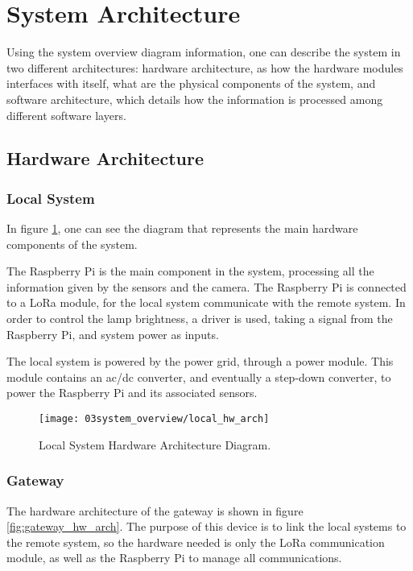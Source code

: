 
\section{System Architecture}
Using the system overview diagram information, one can describe the system in two different architectures: hardware architecture, as how the hardware modules interfaces with itself, what are the physical components of the system, and software architecture, which details how the information is processed among different software layers.

\clearpage
\subsection{Hardware Architecture}

\subsubsection{Local System}

In figure \ref{fig:local_hw_arch}, one can see the diagram that represents the main hardware components of the system.

The Raspberry Pi is the main component in the system, processing all the information given by the sensors and the camera. The Raspberry Pi is connected to a LoRa module, for the local system communicate with the remote system. In order to control the lamp brightness, a driver is used, taking a signal from the Raspberry Pi, and system power as inputs.

The local system is powered by the power grid, through a power module. This module contains an \ac{ac}/\ac{dc} converter, and eventually a step-down converter, to power the Raspberry Pi and its associated sensors.

\begin{figure}[ht]
	\centering
	\texttt{[image: 03system\_overview/local\_hw\_arch]}
	\caption{Local System Hardware Architecture Diagram.}
	\label{fig:local_hw_arch}
\end{figure}

\clearpage
\subsubsection{Gateway}

The hardware architecture of the gateway is shown in figure \ref{fig:gateway_hw_arch}. The purpose of this device is to  link the local systems to the remote system, so the hardware needed is only the LoRa communication module, as well as the Raspberry Pi to manage all communications.

